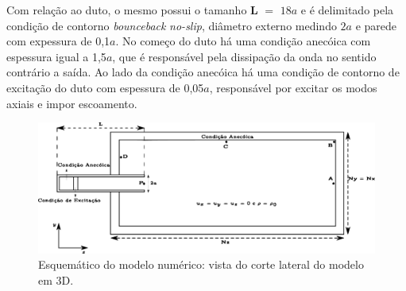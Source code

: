 Com relação ao duto, o mesmo possui o tamanho \textbf{L} $=$ $18a$ e é delimitado pela condição de contorno \textit{bounceback} \textit{no-slip}, diâmetro externo medindo $2a$ e parede com expessura de 0,1$a$. No começo do duto há uma condição anecóica com espessura igual a 1,5$a$, que é responsável pela dissipação da onda no sentido contrário a saída. Ao lado da condição anecóica há uma condição de contorno de excitação do duto com espessura de 0,05$a$, responsável por excitar os modos axiais e impor escoamento.    


\begin{figure}[ht!]
\centering
  \includegraphics[width=1.\linewidth]{figuras/modelo_numerico_2.pdf}
  \caption[Esquemático do modelo numérico]{Esquemático do modelo numérico: vista do corte lateral do modelo em 3D.}
  \label{fig:modelo}
\end{figure}


